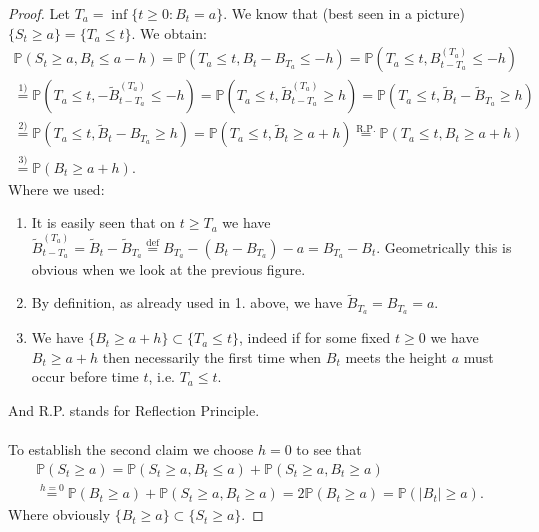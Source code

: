 \documentclass[../mainfile.tex]{subfiles}
\begin{document}
\begin{proof}
Let $T_a = \inf\{ t \geq 0 : B_t=a\}$. We know that (best seen in a picture) $\{S_t \geq a\} = \{T_a \leq t \}$. We obtain:
\begin{align*}
\mathbb{P}(S_t \geq a , B_t \leq a -h ) = \mathbb{P}(T_a \leq t, B_t-B_{T_a} \leq -h) = \mathbb{P}(T_a \leq t ,  B_{t-T_a}^{(T_a)} \leq -h) \\
\overset{1)}= \mathbb{P}(T_a \leq t, - \tilde{B}_{t-T_a}^{(T_a)} \leq -h ) = \mathbb{P}(T_a \leq t , \tilde{B}_{t-T_a}^{(T_a)} \geq h) = \mathbb{P}(T_a \leq t , \tilde{B}_{t}-\tilde{B}_{T_a} \geq h)  \\
\overset{2)}= \mathbb{P}(T_a \leq t, \tilde{B}_t - B_{T_a} \geq h ) = \mathbb{P}(T_a \leq t, \tilde{B}_t \geq a+h) \overset{\text{R.P.}}= \mathbb{P}(T_a \leq t,B_t \geq a+h)  \\
\overset{3)}= \mathbb{P}(B_t \geq a+h).
\end{align*} 
Where we used: 
\begin{enumerate}
\item It is easily seen that on $t \geq T_a$ we have $\tilde{B}_{t-T_a}^{(T_a)} = \tilde{B}_{t}-\tilde{B}_{T_a} \overset{\text{def}}=  B_{T_a}-(B_t-B_{T_a})-a = B_{T_a}-B_t$. Geometrically this is obvious when we look at the previous figure. 
\item By definition, as already used in 1. above, we have $\tilde{B}_{T_a}=B_{T_a}=a$. 
\item We have $\{B_t \geq a +h \} \subset \{ T_a \leq t\}$, indeed if for some fixed $t \geq 0$ we have $B_t \geq a+h$ then necessarily the first time when $B_t$ meets the height $a$ must occur before time $t$, i.e. $T_a \leq t$. 
\end{enumerate}
And R.P. stands for Reflection Principle. 
\\\\
To establish the second claim we choose $h=0$ to see that 
\begin{align*}
\mathbb{P}(S_t \geq a) = \mathbb{P}(S_t \geq a , B_t \leq a) + \mathbb{P}(S_t \geq a , B_t \geq a) \\ \overset{h=0}= \mathbb{P}(B_t \geq a) + \mathbb{P}(S_t  \geq a, B_t \geq a) = 2 \mathbb{P}(B_t \geq a) = \mathbb{P}(|B_t|  \geq a). 
\end{align*}
Where obviously $\{B_t \geq a \} \subset \{ S_t \geq a \}.$
\end{proof}
\newpage
\end{document}
